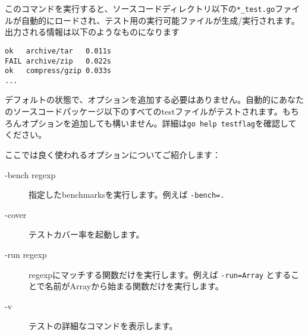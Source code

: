 このコマンドを実行すると、ソースコードディレクトリ以下の\texttt{*\_test.go}ファイルが自動的にロードされ、テスト用の実行可能ファイルが生成/実行されます。出力される情報は以下のようなものになります


\begin{lstlisting}[numbers=none]
ok   archive/tar   0.011s
FAIL archive/zip   0.022s
ok   compress/gzip 0.033s
...
\end{lstlisting}

 デフォルトの状態で、オプションを追加する必要はありません。自動的にあなたのソースコードパッケージ以下のすべてのtestファイルがテストされます。もちろんオプションを追加しても構いません。詳細は\texttt{go help testflag}を確認してください。

ここでは良く使われるオプションについてご紹介します：

\begin{description}
  \item[-bench regexp] 指定したbenchmarksを実行します。例えば \texttt{-bench=.}
  \item[-cover] テストカバー率を起動します。
  \item[-run regexp] regexpにマッチする関数だけを実行します。例えば \texttt{-run=Array} とすることで名前がArrayから始まる関数だけを実行します。
  \item[-v] テストの詳細なコマンドを表示します。
\end{description}

